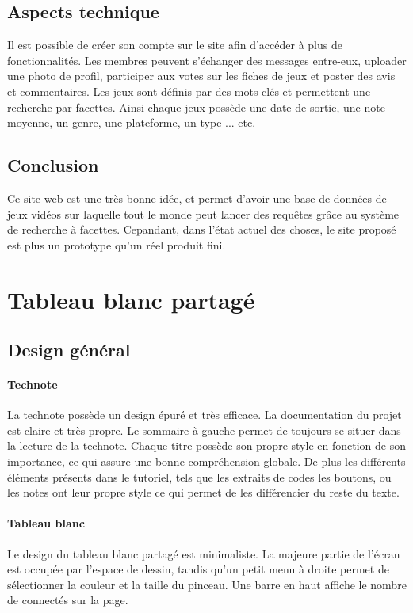 \documentclass[a4paper,11pt]{article}
\begin{document}
\subsection{Aspects technique}
Il est possible de créer son compte sur le site afin d'accéder à plus de fonctionnalités. Les membres peuvent s'échanger des messages entre-eux, uploader une photo de profil, participer aux votes sur les fiches de jeux et poster des avis et commentaires. Les jeux sont définis par des mots-clés et permettent une recherche par facettes. Ainsi chaque jeux possède une date de sortie, une note moyenne, un genre, une plateforme, un type ... etc.
\subsection{Conclusion}
Ce site web est une très bonne idée, et permet d'avoir une base de données de jeux vidéos sur laquelle tout le monde peut lancer des requêtes grâce au système de recherche à facettes. Cepandant, dans l'état actuel des choses, le site proposé est plus un prototype qu'un réel produit fini.
\newpage 

\section{Tableau blanc partagé}
\subsection{Design général}
\paragraph{Technote}
La technote possède un design épuré et très efficace. La documentation du projet est claire et très propre. Le sommaire à gauche permet de toujours se situer dans la lecture de la technote. Chaque titre possède son propre style en fonction de son importance, ce qui assure une bonne compréhension globale. De plus les différents éléments présents dans le tutoriel, tels que les extraits de codes les boutons, ou les notes ont leur propre style ce qui permet de les différencier du reste du texte.
\paragraph{Tableau blanc}
Le design du tableau blanc partagé est minimaliste. La majeure partie de l'écran est occupée par l'espace de dessin, tandis qu'un petit menu à droite permet de sélectionner la couleur et la taille du pinceau. Une barre en haut affiche le nombre de connectés sur la page.
\end{document}
